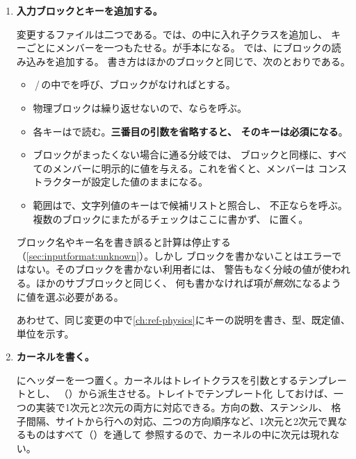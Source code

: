 \begin{enumerate}
\item \textbf{入力ブロックとキーを追加する。}

変更するファイルは二つである。では、の中に入れ子クラスを追加し、
キーごとにメンバーを一つもたせる。が手本になる。
では、にブロックの読み込みを追加する。
書き方はほかのブロックと同じで、次のとおりである。

\begin{itemize}
  \item {}\,/\,の中でを呼び、ブロックがなければとする。
  \item 物理ブロックは繰り返せないので、ならを呼ぶ。
  \item 各キーはで読む。\textbf{三番目の引数を省略すると、
    そのキーは必須になる}。
  \item ブロックがまったくない場合に通る分岐では、
    ブロックと同様に、すべてのメンバーに明示的に値を与える。これを省くと、メンバーは
    コンストラクターが設定した値のままになる。
  \item 範囲はで、文字列値のキーはで候補リストと照合し、
    不正ならを呼ぶ。複数のブロックにまたがるチェックはここに書かず、
    に置く。
\end{itemize}

\begin{warn}
  ブロック名やキー名を書き誤ると計算は停止する（\cref{sec:inputformat:unknown}）。しかし
  ブロックを書かないことはエラーではない。そのブロックを書かない利用者には、
  警告もなく分岐の値が使われる。ほかのサブブロックと同じく、
  何も書かなければ項が\emph{無効}になるように値を選ぶ必要がある。
\end{warn}

あわせて、同じ変更の中で\cref{ch:ref-physics}にキーの説明を書き、型、既定値、単位を示す。

\item \textbf{カーネルを書く。}

にヘッダーを一つ置く。カーネルはトレイトクラスを引数とするテンプレートとし、
（）から派生させる。トレイトでテンプレート化
しておけば、一つの実装で1次元と2次元の両方に対応できる。方向の数、ステンシル、
格子間隔、サイトから行への対応、二つの方向順序など、1次元と2次元で異なるものはすべて（）を通して
参照するので、カーネルの中に次元は現れない。


\end{enumerate}
